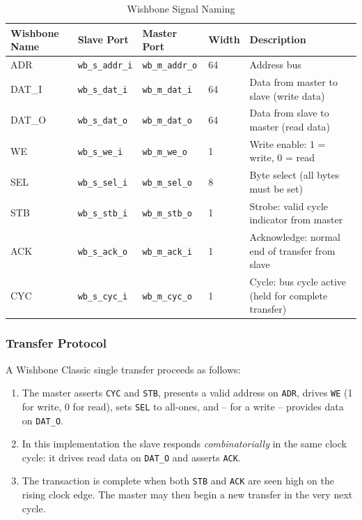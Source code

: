 \begin{table}[H]
\caption{Wishbone Signal Naming}
\label{tab:asBusConcept02}
\centering
\begin{tabularx}{\textwidth}{|l |l |l |l |X|}
  \hline
  Wishbone Name & Slave Port & Master Port & Width & Description \\
  \hline
  \hline
  ADR    & \texttt{wb\_s\_addr\_i} & \texttt{wb\_m\_addr\_o} & 64 & Address bus \\
  \hline
  DAT\_I & \texttt{wb\_s\_dat\_i}  & \texttt{wb\_m\_dat\_i}  & 64 & Data from master to slave (write data) \\
  \hline
  DAT\_O & \texttt{wb\_s\_dat\_o}  & \texttt{wb\_m\_dat\_o}  & 64 & Data from slave to master (read data) \\
  \hline
  WE     & \texttt{wb\_s\_we\_i}   & \texttt{wb\_m\_we\_o}   & 1  & Write enable: 1 = write, 0 = read \\
  \hline
  SEL    & \texttt{wb\_s\_sel\_i}  & \texttt{wb\_m\_sel\_o}  & 8  & Byte select (all bytes must be set) \\
  \hline
  STB    & \texttt{wb\_s\_stb\_i}  & \texttt{wb\_m\_stb\_o}  & 1  & Strobe: valid cycle indicator from master \\
  \hline
  ACK    & \texttt{wb\_s\_ack\_o}  & \texttt{wb\_m\_ack\_i}  & 1  & Acknowledge: normal end of transfer from slave \\
  \hline
  CYC    & \texttt{wb\_s\_cyc\_i}  & \texttt{wb\_m\_cyc\_o}  & 1  & Cycle: bus cycle active (held for complete transfer) \\
  \hline
\end{tabularx}
\end{table}

\subsubsection{Transfer Protocol}

A Wishbone Classic single transfer proceeds as follows:

\begin{enumerate}
  \item The master asserts \texttt{CYC} and \texttt{STB}, presents a valid
    address on \texttt{ADR}, drives \texttt{WE} (1 for write, 0 for read),
    sets \texttt{SEL} to all-ones, and -- for a write -- provides data on
    \texttt{DAT\_O}.
  \item In this implementation the slave responds \emph{combinatorially} in the
    same clock cycle: it drives read data on \texttt{DAT\_O} and asserts
    \texttt{ACK}.
  \item The transaction is complete when both \texttt{STB} and \texttt{ACK}
    are seen high on the rising clock edge.
    The master may then begin a new transfer in the very next cycle.
\end{enumerate}

